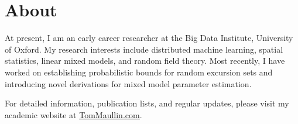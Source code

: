 \documentclass{friggeri-cv}
\begin{document}
\section{About}

At present, I am an early career researcher at the Big Data Institute, University of Oxford. My research interests include distributed machine learning, spatial statistics, linear mixed models, and random field theory. Most recently, I have worked on establishing probabilistic bounds for random excursion sets and introducing novel derivations for mixed model parameter estimation. 

For detailed information, publication lists, and regular updates, please visit my academic website at
\underline{\href{https://TomMaullin.com}{TomMaullin.com}}. 
\vspace{0.3cm}
\end{document}
